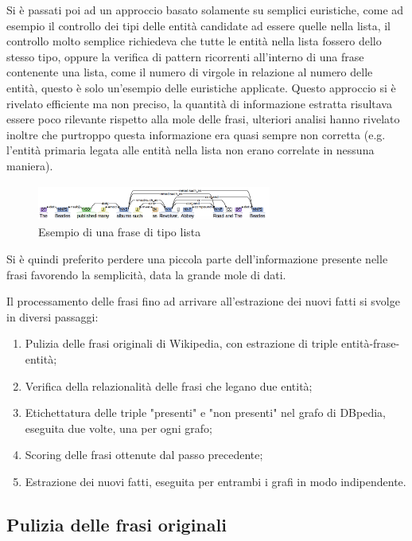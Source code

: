 \documentclass[10pt,a4paper,twocolumn]{article}
\begin{document}
Si è passati poi ad un approccio basato solamente su semplici euristiche, come ad esempio il controllo dei tipi delle entità candidate ad essere quelle nella lista, il controllo molto semplice richiedeva che tutte le entità nella lista fossero dello stesso tipo, oppure la verifica di pattern ricorrenti all'interno di una frase contenente una lista, come il numero di virgole in relazione al numero delle entità, questo è solo un'esempio delle euristiche applicate. Questo approccio si è rivelato efficiente ma non preciso, la quantità di informazione estratta risultava essere poco rilevante rispetto alla mole delle frasi, ulteriori analisi hanno rivelato inoltre che purtroppo questa informazione era quasi sempre non corretta (e.g. l'entità primaria legata alle entità nella lista non erano correlate in nessuna maniera).

\begin{figure}[h]
	\includegraphics[width=7.7cm, height=1.2cm]{stanford}
	\caption{Esempio di una frase di tipo lista}
\end{figure}

Si è quindi preferito perdere una piccola parte dell'informazione presente nelle frasi favorendo la semplicità, data la grande mole di dati.

Il processamento delle frasi fino ad arrivare all'estrazione dei nuovi fatti si svolge in diversi passaggi:
\begin{enumerate}
\item Pulizia delle frasi originali di Wikipedia, con estrazione di triple entità-frase-entità;
\item Verifica della relazionalità delle frasi che legano due entità;
\item Etichettatura delle triple "presenti" e "non presenti" nel grafo di DBpedia, eseguita due volte, una per ogni grafo;
\item Scoring delle frasi ottenute dal passo precedente;
\item Estrazione dei nuovi fatti, eseguita per entrambi i grafi in modo indipendente.
\end{enumerate}

\subsection{Pulizia delle frasi originali}
\end{document}
